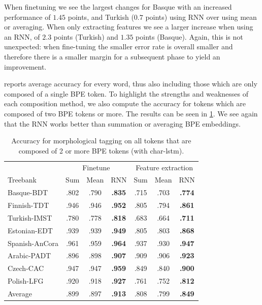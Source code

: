 \documentclass[11pt]{article}
\newcommand\jp[1]{(\textbf{JP:} #1)}
\begin{document}

        When finetuning we see the largest changes for Basque with an
        increased performance of $1.45$ points, and Turkish ($0.7$
        points) using RNN over using mean or averaging. When only
        extracting features we see a larger increase when using an
        RNN, of $2.3$ points (Turkish) and $1.35$ points
        (Basque). Again, this is not unexpected: when fine-tuning the
        smaller error rate is overall smaller and therefore there is a
        smaller margin for a subsequent phase to yield an improvement.

     reports average accuracy for every word,
    thus also including those which are only composed of a single BPE
    token. To highlight the strengths and weaknesses of each
    composition method, we also compute the accuracy for tokens which
    are composed of two BPE tokens or more. The results can be seen in
    \cref{tab:results_large_tokens}.  We see again that the RNN works
    better than summation or averaging BPE embeddings.
    
	\begin{table}%
	\centering
	\begin{tabular}{l|ccc|ccc}
		 & \multicolumn{3}{c}{Finetune} & \multicolumn{3}{c}{Feature extraction} \\
		Treebank & Sum & Mean & RNN & Sum & Mean & RNN  \\
		 \hline
        Basque-BDT      & .802 & .790 & \textbf{.835} & .715 & .703 & \textbf{.774} \\
		Finnish-TDT     & .946 & .946 & \textbf{.952} & .805 & .794 & \textbf{.861} \\ 
		Turkish-IMST    & .780 & .778 & \textbf{.818} & .683 & .664 & \textbf{.711} \\
		Estonian-EDT    & .939 & .939 & \textbf{.949} & .805 & .803 & \textbf{.868} \\
		Spanish-AnCora  & .961 & .959 & \textbf{.964} & .937 & .930 & \textbf{.947} \\
		Arabic-PADT     & .896 & .898 & \textbf{.907} & .909 & .906 & \textbf{.923}\\
		Czech-CAC       & .947 & .947 & \textbf{.959} & .849 & .840 & \textbf{.900} \\
		Polish-LFG      & .920 & .918 & \textbf{.927} & .761 & .752 & \textbf{.812} \\
        \hline
        Average         & .899 & .897 & \textbf{.913} & .808 & .799 & \textbf{.849} \\
	\end{tabular}
    	\caption{\label{tab:results_large_tokens} Accuracy for
     morphological tagging on all tokens that are composed of 2 or
     more BPE tokens (with char-lstm).}
\end{table}
\end{document}
